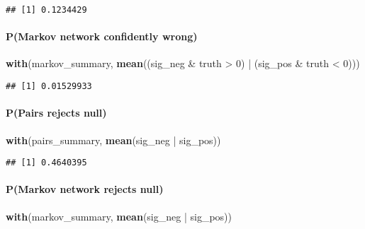 \documentclass[11pt,]{article}
\newenvironment{Shaded}{\begin{snugshade}}{\end{snugshade}}
\newcommand{\KeywordTok}[1]{\textcolor[rgb]{0.13,0.29,0.53}{\textbf{{#1}}}}
\newcommand{\DecValTok}[1]{\textcolor[rgb]{0.00,0.00,0.81}{{#1}}}
\newcommand{\StringTok}[1]{\textcolor[rgb]{0.31,0.60,0.02}{{#1}}}
\newcommand{\NormalTok}[1]{{#1}}
\let\oldparagraph\paragraph
\renewcommand{\paragraph}[1]{\oldparagraph{#1}\mbox{}}
\begin{document}
\begin{verbatim}
## [1] 0.1234429
\end{verbatim}

\paragraph{P(Markov network confidently
wrong)}\label{pmarkov-network-confidently-wrong}

\begin{Shaded}
\begin{Highlighting}[]
\KeywordTok{with}\NormalTok{(markov_summary, }\KeywordTok{mean}\NormalTok{((sig_neg &}\StringTok{ }\NormalTok{truth >}\StringTok{ }\DecValTok{0}\NormalTok{) |}\StringTok{ }\NormalTok{(sig_pos &}\StringTok{ }\NormalTok{truth <}\StringTok{ }\DecValTok{0}\NormalTok{)))}
\end{Highlighting}
\end{Shaded}

\begin{verbatim}
## [1] 0.01529933
\end{verbatim}

\paragraph{P(Pairs rejects null)}\label{ppairs-rejects-null}

\begin{Shaded}
\begin{Highlighting}[]
\KeywordTok{with}\NormalTok{(pairs_summary,  }\KeywordTok{mean}\NormalTok{(sig_neg |}\StringTok{ }\NormalTok{sig_pos))}
\end{Highlighting}
\end{Shaded}

\begin{verbatim}
## [1] 0.4640395
\end{verbatim}

\paragraph{P(Markov network rejects
null)}\label{pmarkov-network-rejects-null}

\begin{Shaded}
\begin{Highlighting}[]
\KeywordTok{with}\NormalTok{(markov_summary,  }\KeywordTok{mean}\NormalTok{(sig_neg |}\StringTok{ }\NormalTok{sig_pos))}
\end{Highlighting}
\end{Shaded}
\end{document}

